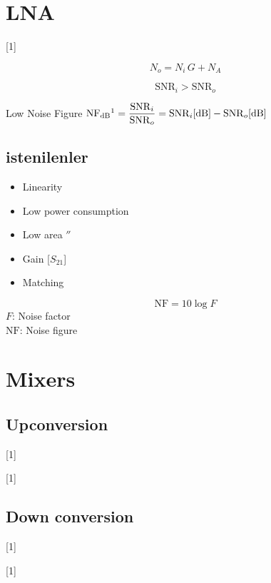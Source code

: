 \documentclass[11pt,a4paper]{article}
\begin{document}

\section{LNA}
[1]

\[ N_o = N_i\,G + N_A \]

\[ \mathrm{SNR}_i > \mathrm{SNR}_o \]

Low Noise Figure \quad $\displaystyle \mathrm{NF}_{\mathrm{dB}}\footnotemark = \frac{\mathrm{SNR}_i}{\mathrm{SNR}_o} = \mathrm{SNR}_i[\mathrm{dB}] - \mathrm{SNR}_o[\mathrm{dB}]$

\subsection{istenilenler}
\begin{itemize}[label={},leftmargin=1em]
\item Linearity
\item Low power consumption
\item Low area \quad $''$
\item Gain [$S_{21}$]
\item Matching
\end{itemize}

\[ \mathrm{NF} = 10\log F \]
$F$: Noise factor \\
$\mathrm{NF}$: Noise figure

\section{Mixers}
\subsection{Upconversion}
[1]

[1]

\subsection{Down conversion}
[1]

[1]
\end{document}
